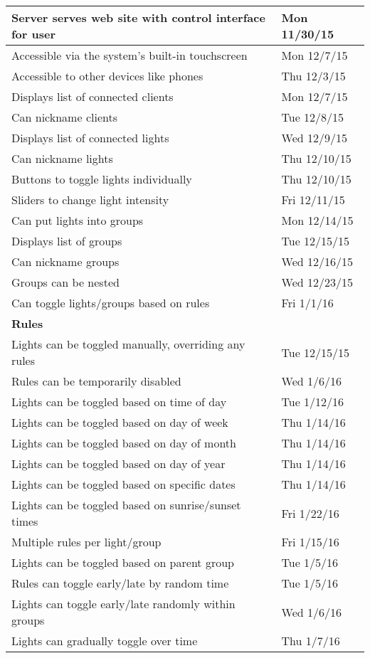 {\begin{tabular}{ | l | l | }
   Server serves web site with control interface for user & Mon 11/30/15 \\ \hline
   Accessible via the system’s built-in touchscreen & Mon 12/7/15 \\ \hline
   Accessible to other devices like phones & Thu 12/3/15 \\ \hline
   Displays list of connected clients & Mon 12/7/15 \\ \hline
   Can nickname clients & Tue 12/8/15 \\ \hline
   Displays list of connected lights & Wed 12/9/15 \\ \hline
   Can nickname lights & Thu 12/10/15 \\ \hline
   Buttons to toggle lights individually & Thu 12/10/15 \\ \hline
   Sliders to change light intensity & Fri 12/11/15 \\ \hline
   Can put lights into groups & Mon 12/14/15 \\ \hline
   Displays list of groups & Tue 12/15/15 \\ \hline
   Can nickname groups & Wed 12/16/15 \\ \hline
   Groups can be nested & Wed 12/23/15 \\ \hline
   Can toggle lights/groups based on rules & Fri 1/1/16 \\ \hline
   
   \textbf{Rules} & \\ \hline
   
   Lights can be toggled manually, overriding any rules & Tue 12/15/15 \\ \hline
   Rules can be temporarily disabled & Wed 1/6/16 \\ \hline
   Lights can be toggled based on time of day & Tue 1/12/16 \\ \hline
   Lights can be toggled based on day of week & Thu 1/14/16 \\ \hline
   Lights can be toggled based on day of month & Thu 1/14/16 \\ \hline
   Lights can be toggled based on day of year & Thu 1/14/16 \\ \hline
   Lights can be toggled based on specific dates & Thu 1/14/16 \\ \hline
   Lights can be toggled based on sunrise/sunset times & Fri 1/22/16 \\ \hline
   Multiple rules per light/group & Fri 1/15/16 \\ \hline
   Lights can be toggled based on parent group & Tue 1/5/16 \\ \hline
   Rules can toggle early/late by random time & Tue 1/5/16 \\ \hline
   Lights can toggle early/late randomly within groups & Wed 1/6/16 \\ \hline
   Lights can gradually toggle over time & Thu 1/7/16 \\ \hline
\end{tabular}
}

